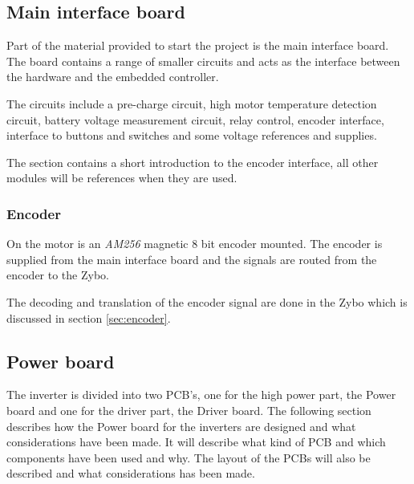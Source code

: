 

\subsection{Main interface board}
Part of the material provided to start the project is the main interface board. The board contains a range of smaller circuits and acts as the interface between the hardware and the embedded controller. 

The circuits include a pre-charge circuit, high motor temperature detection circuit, battery voltage measurement circuit, relay control, encoder interface, interface to buttons and switches and some voltage references and supplies. 

The section contains a short introduction to the encoder interface, all other modules will be references when they are used.



\subsubsection{Encoder}

On the motor is an \textit{AM256} magnetic 8 bit encoder mounted. The encoder is supplied from the main interface board and the signals are routed from the encoder to the Zybo. 

The decoding and translation of the encoder signal are done in the Zybo which is discussed in section \ref{sec:encoder}.


\newpage


\subsection{Power board}
The inverter is divided into two PCB's, one for the high power part, the Power board and one for the driver part, the Driver board. The following section describes how the Power board for the inverters are designed and what considerations have been made. It will describe what kind of PCB and which components have been used and why. The layout of the PCBs will also be described and what considerations has been made. \\

% 
% 

